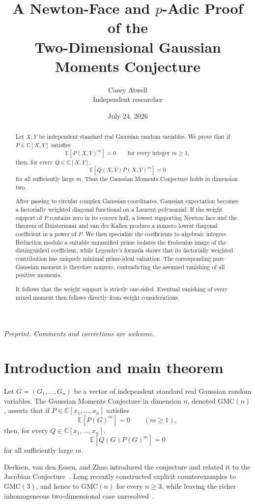 \documentclass[11pt]{article}
\title{\textbf{A Newton-Face and $p$-Adic Proof of the\\Two-Dimensional Gaussian Moments Conjecture}}
\author{Casey Atwell\\Independent researcher}
\date{July 24, 2026}
\theoremstyle{remark}
\newcommand{\E}{\mathbb E}
\newcommand{\C}{\mathbb C}
\begin{document}
\maketitle

\begin{center}
\emph{Preprint. Comments and corrections are welcome.}
\end{center}

\begin{abstract}
Let $X,Y$ be independent standard real Gaussian random variables. We prove that if $P\in\C[X,Y]$ satisfies
\[
\E[P(X,Y)^m]=0
\qquad
\text{for every integer }m\ge 1,
\]
then, for every $Q\in\C[X,Y]$,
\[
\E[Q(X,Y)P(X,Y)^m]=0
\]
for all sufficiently large $m$. Thus the Gaussian Moments Conjecture holds in dimension two.

After passing to circular complex Gaussian coordinates, Gaussian expectation becomes a factorially weighted diagonal functional on a Laurent polynomial. If the weight support of $P$ contains zero in its convex hull, a lowest supporting Newton face and the theorem of Duistermaat and van der Kallen produce a nonzero lowest diagonal coefficient in a power of $P$. We then specialize the coefficients to algebraic integers. Reduction modulo a suitable unramified prime isolates the Frobenius image of the distinguished coefficient, while Legendre's formula shows that its factorially weighted contribution has uniquely minimal prime-ideal valuation. The corresponding pure Gaussian moment is therefore nonzero, contradicting the assumed vanishing of all positive moments.

It follows that the weight support is strictly one-sided. Eventual vanishing of every mixed moment then follows directly from weight considerations.
\end{abstract}

\section{Introduction and main theorem}

Let $G=(G_1,\ldots,G_n)$ be a vector of independent standard real Gaussian random variables. The Gaussian Moments Conjecture in dimension $n$, denoted $\mathrm{GMC}(n)$, asserts that if $P\in\C[x_1,\ldots,x_n]$ satisfies
\[
\E[P(G)^m]=0
\qquad(m\ge1),
\]
then, for every $Q\in\C[x_1,\ldots,x_n]$,
\[
\E[Q(G)P(G)^m]=0
\]
for all sufficiently large $m$.

Derksen, van den Essen, and Zhao introduced the conjecture and related it to the Jacobian Conjecture~\cite{DEVZ}. Long recently constructed explicit counterexamples to $\mathrm{GMC}(3)$, and hence to $\mathrm{GMC}(n)$ for every $n\ge3$, while leaving the richer inhomogeneous two-dimensional case unresolved~\cite[Corollary 5.2 and Section 7]{Long}.
\end{document}
